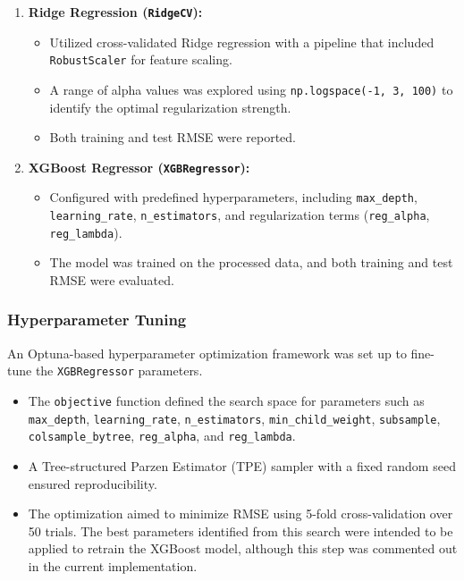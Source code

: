 \documentclass[11pt,a4paper]{article}
\begin{document}
\begin{enumerate}

  \item \textbf{Ridge Regression (\texttt{RidgeCV}):}
        \begin{itemize}
          \item Utilized cross-validated Ridge regression with a pipeline that included
                \texttt{RobustScaler} for feature scaling.
          \item A range of alpha values was explored using \texttt{np.logspace(-1, 3, 100)} to
                identify the optimal regularization strength.
          \item Both training and test RMSE were reported.
        \end{itemize}

  \item \textbf{XGBoost Regressor (\texttt{XGBRegressor}):}
        \begin{itemize}
          \item Configured with predefined hyperparameters, including \texttt{max\_depth},
                \texttt{learning\_rate}, \texttt{n\_estimators}, and regularization terms
                (\texttt{reg\_alpha}, \texttt{reg\_lambda}).
          \item The model was trained on the processed data, and both training and test RMSE
                were evaluated.
        \end{itemize}
\end{enumerate}

\subsubsection{Hyperparameter Tuning}
An Optuna-based hyperparameter optimization framework was set up to fine-tune
the \texttt{XGBRegressor} parameters.

\begin{itemize}
  \item The \texttt{objective} function defined the search space for parameters such as
        \texttt{max\_depth}, \texttt{learning\_rate}, \texttt{n\_estimators},
        \texttt{min\_child\_weight}, \texttt{subsample}, \texttt{colsample\_bytree},
        \texttt{reg\_alpha}, and \texttt{reg\_lambda}.
  \item A Tree-structured Parzen Estimator (TPE) sampler with a fixed random seed
        ensured reproducibility.
  \item The optimization aimed to minimize RMSE using 5-fold cross-validation over 50
        trials. The best parameters identified from this search were intended to be
        applied to retrain the XGBoost model, although this step was commented out in
        the current implementation.
\end{itemize}
\end{document}
